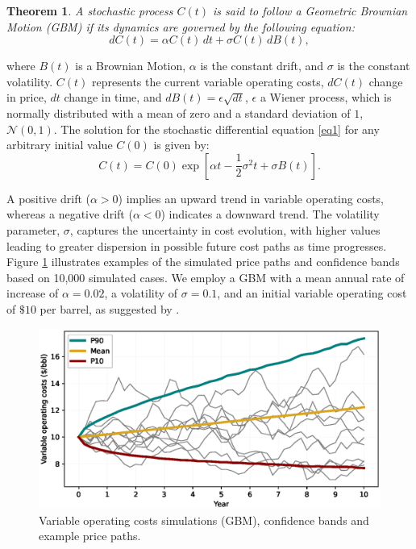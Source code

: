 \documentclass[pdflatex,sn-basic]{sn-jnl}%
\theoremstyle{thmstyleone}%
\newtheorem{theorem}{Theorem}%
\theoremstyle{thmstyletwo}%
\theoremstyle{thmstylethree}%
\begin{document}
\begin{theorem}
\theoremstyle{thmstyletwo}
A stochastic process $C(t)$ is said to follow a Geometric Brownian Motion (GBM) if its dynamics are governed by the following equation: 
\begin{equation}
dC(t) = \alpha C(t)\,dt + \sigma C(t)\,dB(t),
\label{eq1}
\end{equation}
\end{theorem} 
\noindent
where $B(t)$ is a Brownian Motion, $\alpha$ is the constant drift, and $\sigma$ is the constant volatility. $C(t)$ represents the current variable operating costs, $dC(t)$ change in price, $dt$ change in time, and $dB(t)=\epsilon \sqrt{dt}$, $\epsilon$ a Wiener process, which is normally distributed with a mean of zero and a standard deviation of $1$, $\mathcal{N}(0, 1)$. The solution for the stochastic differential equation \ref{eq1} for any arbitrary initial value $C(0)$ is given by:
\begin{equation}
C(t) = C(0) \exp\left[ \alpha t - \frac{1}{2} \sigma^2 t + \sigma B(t) \right].
\label{eq2}
\end{equation}

A positive drift ($\alpha > 0$) implies an upward trend in variable operating costs, whereas a negative drift ($\alpha < 0$) indicates a downward trend. The volatility parameter, $\sigma$, captures the uncertainty in cost evolution, with higher values leading to greater dispersion in possible future cost paths as time progresses. Figure \ref{fig10} illustrates examples of the simulated price paths and confidence bands based on 10,000 simulated cases. We employ a GBM with a mean annual rate of increase of $\alpha=0.02$, a volatility of $\sigma=0.1$, and an initial variable operating cost of $\$10$ per barrel, as suggested by \cite{ref12a}.

\begin{figure}[H]
\centering
\begin{minipage}{0.95\textwidth}
  \includegraphics[width=\textwidth]{VOC_profile.eps}
  \caption{Variable operating costs simulations (GBM), confidence bands and example price paths.}
  \label{fig10}
\end{minipage}
\end{figure}
\end{document}
